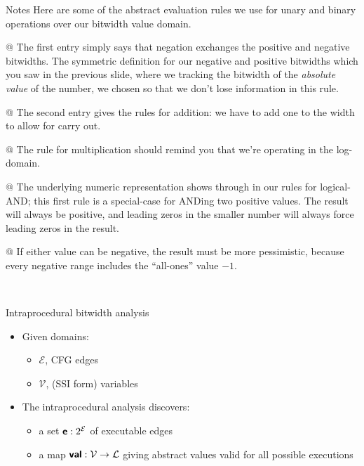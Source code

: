 \documentclass[%
pdf,
colorBG,
slideColor,
nototal,
oqe
]{prosper}
\newcommand{\func}[1]{\ensuremath{\text{\sffamily\bfseries #1}}}
\newenvironment{talknotes}{\begin{slide}{Notes}\tiny}{\end{slide}}
\begin{document}
\begin{talknotes}
Here are some of the abstract evaluation rules we use for
unary and binary operations over
our bitwidth value domain.

@ The first entry simply says that negation
exchanges the positive and negative bitwidths.
The symmetric definition for our negative and positive
bitwidths which you saw in the previous slide, where we 
tracking the bitwidth of the \textit{absolute value} of the number,
we chosen so that we don't lose information in this rule.

@ The second entry gives
the rules for addition: we have to add one to the width to allow for
carry out.

@ The rule for multiplication should remind you that we're
operating in the log-domain.  

@ The underlying numeric representation
shows through in our rules for logical-AND; this first rule is a
special-case for ANDing two positive values.  The result will always
be positive, and leading zeros in the smaller number will always force
leading zeros in the result.

@ If either value can be negative, the result must be more
pessimistic, because every negative range includes the ``all-ones''
value $-1$.

~%
\end{talknotes}

\begin{slide}{Intraprocedural bitwidth analysis}
\begin{itemize}
\item Given domains:
\begin{itemize}
\item $\mathcal{E}$, CFG edges
\item $\mathcal{V}$, (SSI form) variables
\end{itemize}
\item The intraprocedural analysis discovers:
\begin{itemize}
\item a set $\func{e}:2^\mathcal{E}$ of executable edges
\item a map $\func{val}:\mathcal{V}\to\mathcal{L}$ giving abstract
  values valid for all possible executions
\end{itemize}
\end{itemize}
\end{slide}
\end{document}
